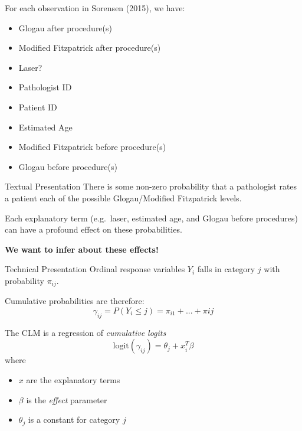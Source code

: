 \documentclass{beamer}
\begin{document}
\begin{frame}
For each observation in Sorensen (2015), we have:

\begin{itemize}
\item Glogau after procedure(s)
\item Modified Fitzpatrick after procedure(s)
\item Laser?
\item Pathologist ID
\item Patient ID
\item Estimated Age
\item Modified Fitzpatrick before procedure(s)
\item Glogau before procedure(s)
\end{itemize}
\end{frame}

\begin{frame}{Textual Presentation}
There is some non-zero probability that a pathologist rates a patient each of the possible Glogau/Modified Fitzpatrick levels.

\vspace{10px}

Each explanatory term (e.g.\ laser, estimated age, and Glogau before procedures) can have a profound effect on these probabilities.

\vspace{10px}

\textbf{We want to infer about these effects!}
\end{frame}

\begin{frame}{Technical Presentation}
Ordinal response variables $Y_i$ falls in category $j$ with probability $\pi_{ij}$.

\vspace{10px}

Cumulative probabilities are therefore:
\begin{equation}
\gamma_{ij}=P(Y_i \leq j) = \pi_{i1}+...+\pi{ij}
\end{equation}

\vspace{10px}

The CLM is a regression of \emph{cumulative logits}
\begin{equation}
\mbox{logit}(\gamma_{ij}) = \theta_j + x_i^T\beta
\end{equation}
where 
\begin{itemize}
\item $x$ are the explanatory terms
\item $\beta$ is the \emph{effect} parameter
\item $\theta_j$ is a constant for category $j$
\end{itemize}
\end{frame}
\end{document}
